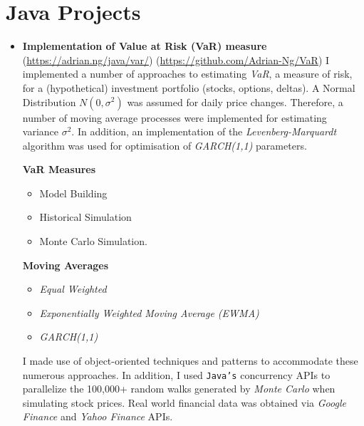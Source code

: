 \documentclass[letterpaper,11pt]{article}
\begin{document}
\section{Java Projects}
\begin{itemize}
	\item {
	      \textbf{Implementation of Value at Risk (VaR) measure}
	      \hfill
	      \tiny
	      (\href{https://adrian.ng/java/var/}{https://adrian.ng/java/var/})
	      \hfill
	      (\href{https://github.com/Adrian-Ng/VaR}{https://github.com/Adrian-Ng/VaR})
	      \newline
	      \small
	      I implemented a number of approaches to estimating \textit{VaR}, a measure of risk, for a (hypothetical) investment portfolio (stocks, options, deltas). A Normal Distribution $N(0, \sigma^2)$ was assumed for daily price changes. Therefore, a number of moving average processes were implemented for estimating variance $\sigma^2$.
	      In addition, an implementation of the \textit{Levenberg-Marquardt} algorithm was used for optimisation of \textit{GARCH(1,1)} parameters.
	      \begin{multicols}{2}
		      \textbf{VaR Measures}
		      \begin{itemize}
			      \item Model Building
			      \item Historical Simulation
			      \item Monte Carlo Simulation.
		      \end{itemize}
		      \columnbreak
		      \textbf{Moving Averages}
		      \begin{itemize}
			      \item \textit{Equal Weighted}
			      \item \textit{Exponentially Weighted Moving Average (EWMA)}
			      \item \textit{GARCH(1,1)}
		      \end{itemize}
	      \end{multicols}
	      I made use of object-oriented techniques and patterns to accommodate these numerous approaches.
	      In addition, I used \texttt{Java's} concurrency APIs to parallelize the 100,000+ random walks generated by \textit{Monte Carlo} when simulating stock prices.
	      Real world financial data was obtained via \textit{Google Finance} and \textit{Yahoo Finance} APIs.
}
\end{itemize}
\end{document}
